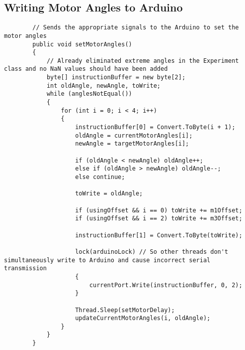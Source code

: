 
\subsection{Writing Motor Angles to Arduino}
\begin{lstlisting}
        // Sends the appropriate signals to the Arduino to set the motor angles
        public void setMotorAngles()
        {
            // Already eliminated extreme angles in the Experiment class and no NaN values should have been added
            byte[] instructionBuffer = new byte[2];
            int oldAngle, newAngle, toWrite;
            while (anglesNotEqual())
            {
                for (int i = 0; i < 4; i++)
                {
                    instructionBuffer[0] = Convert.ToByte(i + 1);
                    oldAngle = currentMotorAngles[i];
                    newAngle = targetMotorAngles[i];

                    if (oldAngle < newAngle) oldAngle++;
                    else if (oldAngle > newAngle) oldAngle--;
                    else continue;

                    toWrite = oldAngle;

                    if (usingOffset && i == 0) toWrite += m1Offset;
                    if (usingOffset && i == 2) toWrite += m3Offset;

                    instructionBuffer[1] = Convert.ToByte(toWrite);

                    lock(arduinoLock) // So other threads don't simultaneously write to Arduino and cause incorrect serial transmission
                    {
                        currentPort.Write(instructionBuffer, 0, 2);
                    }

                    Thread.Sleep(setMotorDelay);
                    updateCurrentMotorAngles(i, oldAngle);
                }
            }
        }
\end{lstlisting}



\pagebreak
